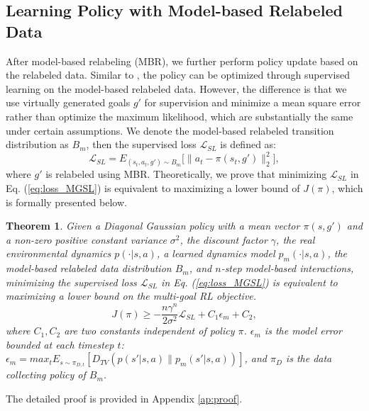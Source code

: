 \documentclass{article}
\newtheorem{theorem}{Theorem}
\begin{document}
\subsection{Learning Policy with Model-based Relabeled Data}
After model-based relabeling (MBR), we further perform policy update based on the relabeled data. Similar to \cite{ghosh2021learning}, the policy can be optimized through supervised learning on the model-based relabeled data. However, the difference is that we use virtually generated goals $g'$ for supervision and minimize a mean square error rather than optimize the maximum likelihood, which are substantially the same under certain assumptions. We denote the model-based relabeled transition distribution as $B_m$, then the supervised loss $\mathcal{L}_{SL}$ is defined as:
\begin{equation}
\label{eq:loss_MGSL}
    \mathcal{L}_{SL} = E_{(s_t,a_t,g') \sim B_m} \big[\|a_t - \pi(s_t,g')\|_2^2 \big],
\end{equation}
where $g'$ is relabeled using MBR. Theoretically, we prove that minimizing $\mathcal{L}_{SL}$ in Eq. (\ref{eq:loss_MGSL}) is equivalent to maximizing a lower bound of $J(\pi)$, which is formally presented below.
\begin{theorem}
\label{tm:lowerbound}
    Given a Diagonal Gaussian policy with a mean vector $\pi(s,g')$ and a non-zero positive constant variance $\sigma^2$, the discount factor $\gamma$, the real environmental dynamics $p(\cdot|s,a)$, a learned dynamics model $p_m(\cdot|s,a)$, the model-based relabeled data distribution $B_m$, and $n$-step model-based interactions, minimizing the supervised loss $\mathcal{L}_{SL}$ in Eq. (\ref{eq:loss_MGSL}) is equivalent to maximizing a lower bound on the multi-goal RL objective.
    \begin{equation*}
        J(\pi) \geq -\frac{n\gamma^n}{2\sigma^2} \mathcal{L}_{SL} + C_1 \epsilon_{m} + C_2 ,
    \end{equation*}
    where $C_1, C_2$ are two constants independent of policy $\pi$. $\epsilon_m$ is the model error bounded at each timestep $t$: $\epsilon_m=max_t E_{s\sim \pi_{D,t}} [D_{TV}(p(s'|s,a)\| p_m(s'|s,a))]$, and $\pi_D$ is the data collecting policy of $B_m$.
\end{theorem}
 The detailed proof is provided in Appendix \ref{ap:proof}.
 
%  
\end{document}
